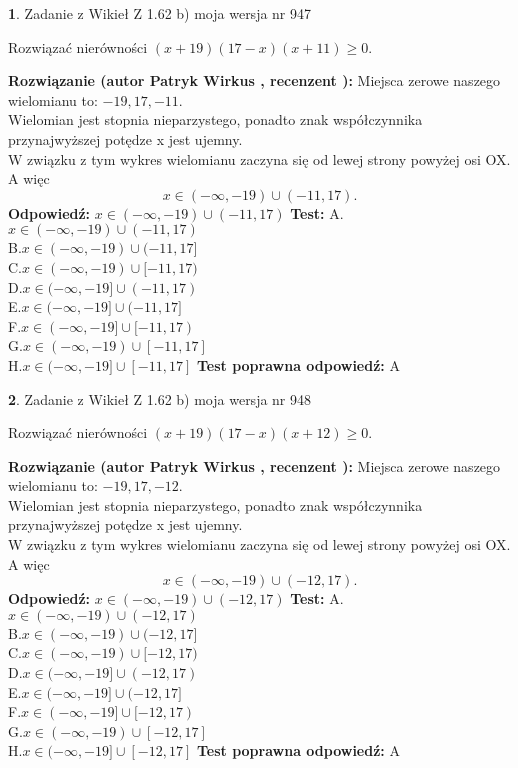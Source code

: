 \documentclass[12pt, a4paper]{article}
\theoremstyle{definition} %
\newtheorem{zad}{}
\newcommand{\zadStart}[1]{\begin{zad}#1\newline}
\newcommand{\zadStop}{\end{zad}}
\newcommand{\rozwStart}[2]{\noindent \textbf{Rozwiązanie (autor #1 , recenzent #2): }\newline}
\newcommand{\rozwStop}{\newline}
\newcommand{\odpStart}{\noindent \textbf{Odpowiedź:}\newline}
\newcommand{\odpStop}{\newline}
\newcommand{\testStart}{\noindent \textbf{Test:}\newline}
\newcommand{\testStop}{\newline}
\newcommand{\kluczStart}{\noindent \textbf{Test poprawna odpowiedź:}\newline}
\newcommand{\kluczStop}{\newline}
\begin{document}
\zadStart{Zadanie z Wikieł Z 1.62 b) moja wersja nr 947}

Rozwiązać nierówności $(x+19)(17-x)(x+11)\ge0$.
\zadStop
\rozwStart{Patryk Wirkus}{}
Miejsca zerowe naszego wielomianu to: $-19, 17, -11$.\\
Wielomian jest stopnia nieparzystego, ponadto znak współczynnika przy\linebreak najwyższej potędze x jest ujemny.\\ W związku z tym wykres wielomianu zaczyna się od lewej strony powyżej osi OX. A więc $$x \in (-\infty,-19) \cup (-11,17).$$
\rozwStop
\odpStart
$x \in (-\infty,-19) \cup (-11,17)$
\odpStop
\testStart
A.$x \in (-\infty,-19) \cup (-11,17)$\\
B.$x \in (-\infty,-19) \cup (-11,17]$\\
C.$x \in (-\infty,-19) \cup [-11,17)$\\
D.$x \in (-\infty,-19] \cup (-11,17)$\\
E.$x \in (-\infty,-19] \cup (-11,17]$\\
F.$x \in (-\infty,-19] \cup [-11,17)$\\
G.$x \in (-\infty,-19) \cup [-11,17]$\\
H.$x \in (-\infty,-19] \cup [-11,17]$
\testStop
\kluczStart
A
\kluczStop



\zadStart{Zadanie z Wikieł Z 1.62 b) moja wersja nr 948}

Rozwiązać nierówności $(x+19)(17-x)(x+12)\ge0$.
\zadStop
\rozwStart{Patryk Wirkus}{}
Miejsca zerowe naszego wielomianu to: $-19, 17, -12$.\\
Wielomian jest stopnia nieparzystego, ponadto znak współczynnika przy\linebreak najwyższej potędze x jest ujemny.\\ W związku z tym wykres wielomianu zaczyna się od lewej strony powyżej osi OX. A więc $$x \in (-\infty,-19) \cup (-12,17).$$
\rozwStop
\odpStart
$x \in (-\infty,-19) \cup (-12,17)$
\odpStop
\testStart
A.$x \in (-\infty,-19) \cup (-12,17)$\\
B.$x \in (-\infty,-19) \cup (-12,17]$\\
C.$x \in (-\infty,-19) \cup [-12,17)$\\
D.$x \in (-\infty,-19] \cup (-12,17)$\\
E.$x \in (-\infty,-19] \cup (-12,17]$\\
F.$x \in (-\infty,-19] \cup [-12,17)$\\
G.$x \in (-\infty,-19) \cup [-12,17]$\\
H.$x \in (-\infty,-19] \cup [-12,17]$
\testStop
\kluczStart
A
\kluczStop
\end{document}
